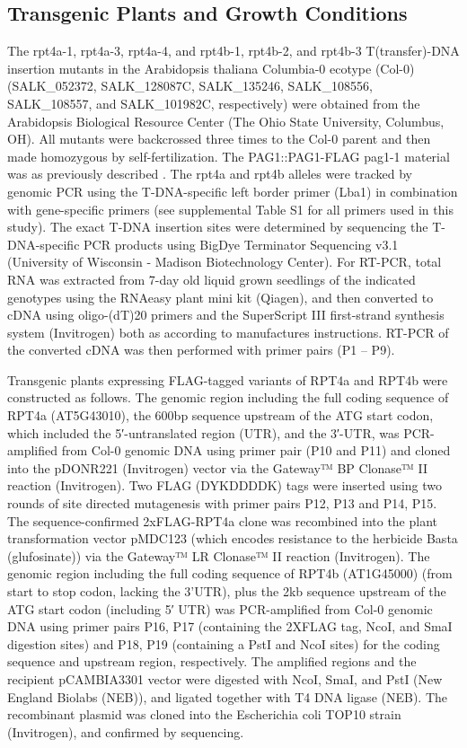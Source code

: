 \subsection{Transgenic Plants and Growth Conditions}
	The rpt4a-1, rpt4a-3, rpt4a-4, and rpt4b-1, rpt4b-2, and rpt4b-3 T(transfer)-DNA insertion mutants in the Arabidopsis thaliana Columbia-0 ecotype (Col-0) (SALK\_052372, SALK\_128087C, SALK\_135246, SALK\_108556, SALK\_108557, and SALK\_101982C, respectively) were obtained from the Arabidopsis Biological Resource Center (The Ohio State University, Columbus, OH). All mutants were backcrossed three times to the Col-0 parent and then made homozygous by self-fertilization. The PAG1::PAG1-FLAG pag1-1 material was as previously described \citep{book10}. The rpt4a and rpt4b alleles were tracked by genomic PCR using the T-DNA-specific left border primer (Lba1) in combination with gene-specific primers (see supplemental Table S1 for all primers used in this study). The exact T-DNA insertion sites were determined by sequencing the T-DNA-specific PCR products using BigDye Terminator Sequencing v3.1 (University of Wisconsin - Madison Biotechnology Center). For RT-PCR, total RNA was extracted from 7-day old liquid grown seedlings of the indicated genotypes using the RNAeasy plant mini kit (Qiagen), and then converted to cDNA using oligo-(dT)20 primers and the SuperScript III first-strand synthesis system (Invitrogen) both as according to manufactures instructions. RT-PCR of the converted cDNA was then performed with primer pairs (P1 – P9).
  
	Transgenic plants expressing FLAG-tagged variants of RPT4a and RPT4b were constructed as follows. The genomic region including the full coding sequence of RPT4a (AT5G43010), the 600bp sequence upstream of the ATG start codon, which included the 5′-untranslated region (UTR), and the 3′-UTR, was PCR-amplified from Col-0 genomic DNA using primer pair (P10 and P11) and cloned into the pDONR221 (Invitrogen) vector via the Gateway™ BP Clonase™ II reaction (Invitrogen). Two FLAG (DYKDDDDK) tags were inserted using two rounds of site directed mutagenesis \citep{edelheit09} with primer pairs P12, P13 and P14, P15. The sequence-confirmed 2xFLAG-RPT4a clone was recombined into the plant transformation vector pMDC123 (which encodes resistance to the herbicide Basta (glufosinate)) via the Gateway™ LR Clonase™ II reaction (Invitrogen). The genomic region including the full coding sequence of RPT4b (AT1G45000) (from start to stop codon, lacking the 3’UTR), plus the 2kb sequence upstream of the ATG start codon (including 5′ UTR) was PCR-amplified from Col-0 genomic DNA using primer pairs P16, P17 (containing the 2XFLAG tag, NcoI, and SmaI digestion sites) and P18, P19 (containing a PstI and NcoI sites) for the coding sequence and upstream region, respectively. The amplified regions and the recipient pCAMBIA3301 vector were digested with NcoI, SmaI, and PstI (New England Biolabs (NEB)), and ligated together with T4 DNA ligase (NEB). The recombinant plasmid was cloned into the Escherichia coli TOP10 strain (Invitrogen), and confirmed by sequencing.

